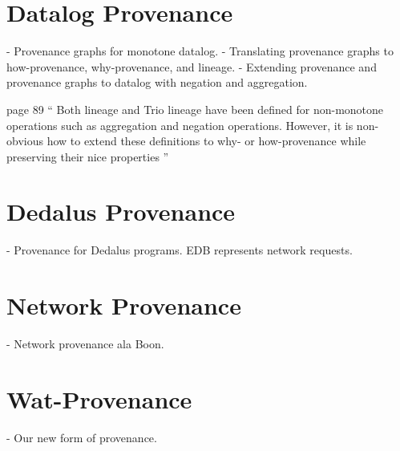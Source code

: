 \documentclass{mwhittaker}
\begin{document}
\section{Datalog Provenance}
- Provenance graphs for monotone datalog.
- Translating provenance graphs to how-provenance, why-provenance, and lineage.
- Extending provenance and provenance graphs to datalog with negation and
  aggregation.

page 89
``
Both lineage and Trio lineage have been defined for non-monotone operations
such as aggregation and negation operations. However, it is non-obvious how to
extend these definitions to why- or how-provenance while preserving their nice
properties
''

\section{Dedalus Provenance}
- Provenance for Dedalus programs. EDB represents network requests.

\section{Network Provenance}
- Network provenance ala Boon.

\section{Wat-Provenance}
- Our new form of provenance.
\end{document}
